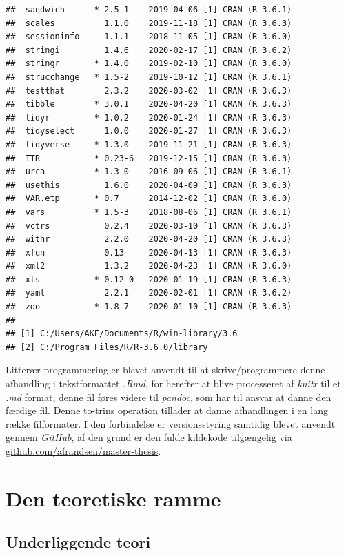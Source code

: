 \documentclass[
  a4paper,
  oneside]{memoir}
\begin{document}
\begin{verbatim}
##  sandwich      * 2.5-1    2019-04-06 [1] CRAN (R 3.6.1)   
##  scales          1.1.0    2019-11-18 [1] CRAN (R 3.6.3)   
##  sessioninfo     1.1.1    2018-11-05 [1] CRAN (R 3.6.0)   
##  stringi         1.4.6    2020-02-17 [1] CRAN (R 3.6.2)   
##  stringr       * 1.4.0    2019-02-10 [1] CRAN (R 3.6.0)   
##  strucchange   * 1.5-2    2019-10-12 [1] CRAN (R 3.6.1)   
##  testthat        2.3.2    2020-03-02 [1] CRAN (R 3.6.3)   
##  tibble        * 3.0.1    2020-04-20 [1] CRAN (R 3.6.3)   
##  tidyr         * 1.0.2    2020-01-24 [1] CRAN (R 3.6.3)   
##  tidyselect      1.0.0    2020-01-27 [1] CRAN (R 3.6.3)   
##  tidyverse     * 1.3.0    2019-11-21 [1] CRAN (R 3.6.3)   
##  TTR           * 0.23-6   2019-12-15 [1] CRAN (R 3.6.3)   
##  urca          * 1.3-0    2016-09-06 [1] CRAN (R 3.6.1)   
##  usethis         1.6.0    2020-04-09 [1] CRAN (R 3.6.3)   
##  VAR.etp       * 0.7      2014-12-02 [1] CRAN (R 3.6.0)   
##  vars          * 1.5-3    2018-08-06 [1] CRAN (R 3.6.1)   
##  vctrs           0.2.4    2020-03-10 [1] CRAN (R 3.6.3)   
##  withr           2.2.0    2020-04-20 [1] CRAN (R 3.6.3)   
##  xfun            0.13     2020-04-13 [1] CRAN (R 3.6.3)   
##  xml2            1.3.2    2020-04-23 [1] CRAN (R 3.6.0)   
##  xts           * 0.12-0   2020-01-19 [1] CRAN (R 3.6.3)   
##  yaml            2.2.1    2020-02-01 [1] CRAN (R 3.6.2)   
##  zoo           * 1.8-7    2020-01-10 [1] CRAN (R 3.6.3)   
## 
## [1] C:/Users/AKF/Documents/R/win-library/3.6
## [2] C:/Program Files/R/R-3.6.0/library
\end{verbatim}

Litterær programmering er blevet anvendt til at skrive/programmere denne afhandling i tekstformattet \emph{.Rmd}, for herefter at blive processeret af \emph{knitr} til et \emph{.md} format, denne fil føres videre til \emph{pandoc}, som har til ansvar at danne den færdige fil. Denne to-trins operation tillader at danne afhandlingen i en lang række filformater. I den forbindelse er versionsstyring samtidig blevet anvendt gennem \emph{GitHub}, af den grund er den fulde kildekode tilgængelig via \href{https://github.com/afrandsen/master-thesis}{github.com/afrandsen/master-thesis}.

\newpage

\part{Den teoretiske ramme}

\hypertarget{unteo}{%
\chapter{Underliggende teori}\label{unteo}}
\end{document}

